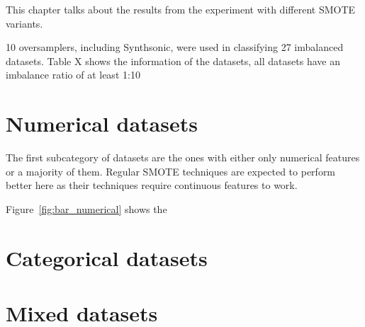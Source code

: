 
This chapter talks about the results from the experiment with different SMOTE variants. 

10 oversamplers, including Synthsonic, were used in classifying 27 imbalanced datasets. Table X shows the information of the datasets, all datasets have an imbalance ratio of at least 1:10

\section{Numerical datasets}
The first subcategory of datasets are the ones with either only numerical features or a majority of them. Regular SMOTE techniques are expected to perform better here as their techniques require continuous features to work.

Figure~\ref{fig:bar_numerical} shows the 


\section{Categorical datasets}

\section{Mixed datasets}




